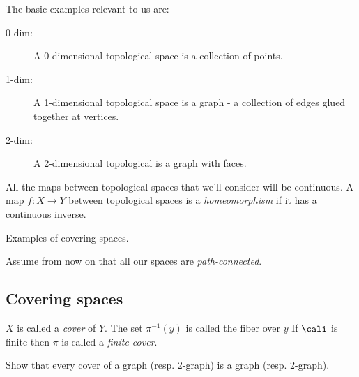   The basic examples relevant to us are:
  \begin{description}
    \item[0-dim: ]
      A 0-dimensional topological space is a collection of points.
    \item[1-dim: ]
      A 1-dimensional topological space is a graph - a collection of edges glued together at vertices.
    \item[2-dim: ]
      A 2-dimensional topological is a graph with faces.
  \end{description}
  All the maps between topological spaces that we'll consider will be continuous.
  A map $f:X \rightarrow Y$ between topological spaces is a \emph{homeomorphism} if it has a continuous inverse.

  \begin{ex}
    Examples of covering spaces.
  \end{ex}

  \begin{mdframed}
    Assume from now on that all our spaces are \emph{path-connected}.
  \end{mdframed}










  \subsection{Covering spaces}

  $X$ is called a \emph{cover} of $Y$.
  The set $\pi^{-1}(y)$ is called the fiber over $y$
  If $\cali$ is finite then $\pi$ is called a \emph{finite cover}.

  \begin{qbox}
    Show that every cover of a graph (resp. 2-graph) is a graph (resp. 2-graph).
  \end{qbox}












